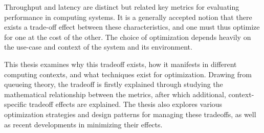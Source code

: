 \documentclass[english,12pt,a4paper,pdftex,sci,utf8]{aaltothesis}
\begin{document}
\begin{abstractpage}[english]

Throughput and latency are distinct but related key metrics for evaluating performance in computing systems. It is a generally accepted notion that there exists a trade-off effect between these characteristics, and one must thus optimize for one at the cost of the other. The choice of optimization depends heavily on the use-case and context of the system and its environment.

This thesis examines why this tradeoff exists, how it manifests in different computing contexts, and what techniques exist for optimization. Drawing from queueing theory, the tradeoff is firstly explained through studying the mathematical relationship between the metrics, after which additional, context-specific tradeoff effects are explained. The thesis also explores various optimization strategies and design patterns for managing these tradeoffs, as well as recent developments in minimizing their effects.
\end{abstractpage}

\newpage
%
\end{document}
